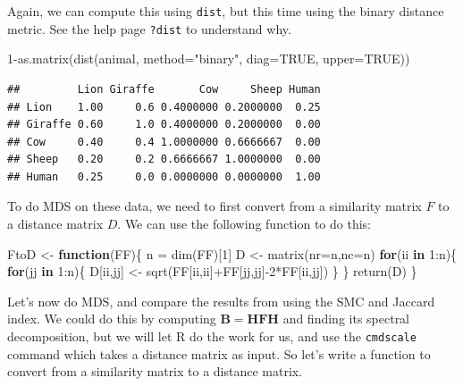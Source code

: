 \documentclass[
]{book}
\newenvironment{Shaded}{\begin{snugshade}}{\end{snugshade}}
\newcommand{\AttributeTok}[1]{\textcolor[rgb]{0.77,0.63,0.00}{#1}}
\newcommand{\ConstantTok}[1]{\textcolor[rgb]{0.00,0.00,0.00}{#1}}
\newcommand{\ControlFlowTok}[1]{\textcolor[rgb]{0.13,0.29,0.53}{\textbf{#1}}}
\newcommand{\DecValTok}[1]{\textcolor[rgb]{0.00,0.00,0.81}{#1}}
\newcommand{\FunctionTok}[1]{\textcolor[rgb]{0.00,0.00,0.00}{#1}}
\newcommand{\NormalTok}[1]{#1}
\newcommand{\OtherTok}[1]{\textcolor[rgb]{0.56,0.35,0.01}{#1}}
\newcommand{\SpecialCharTok}[1]{\textcolor[rgb]{0.00,0.00,0.00}{#1}}
\newcommand{\StringTok}[1]{\textcolor[rgb]{0.31,0.60,0.02}{#1}}
\theoremstyle{definition}
\theoremstyle{definition}
\theoremstyle{definition}
\theoremstyle{definition}
\theoremstyle{remark}
\begin{document}
Again, we can compute this using \texttt{dist}, but this time using the binary distance metric. See the help page \texttt{?dist} to understand why.

\begin{Shaded}
\begin{Highlighting}[]
\DecValTok{1}\SpecialCharTok{{-}}\FunctionTok{as.matrix}\NormalTok{(}\FunctionTok{dist}\NormalTok{(animal, }\AttributeTok{method=}\StringTok{"binary"}\NormalTok{, }\AttributeTok{diag=}\ConstantTok{TRUE}\NormalTok{, }\AttributeTok{upper=}\ConstantTok{TRUE}\NormalTok{))}
\end{Highlighting}
\end{Shaded}

\begin{verbatim}
##         Lion Giraffe       Cow     Sheep Human
## Lion    1.00     0.6 0.4000000 0.2000000  0.25
## Giraffe 0.60     1.0 0.4000000 0.2000000  0.00
## Cow     0.40     0.4 1.0000000 0.6666667  0.00
## Sheep   0.20     0.2 0.6666667 1.0000000  0.00
## Human   0.25     0.0 0.0000000 0.0000000  1.00
\end{verbatim}

To do MDS on these data, we need to first convert from a similarity matrix \(F\) to a distance matrix \(D\). We can use the following function to do this:

\begin{Shaded}
\begin{Highlighting}[]
\NormalTok{FtoD }\OtherTok{\textless{}{-}} \ControlFlowTok{function}\NormalTok{(FF)\{}
\NormalTok{  n }\OtherTok{=} \FunctionTok{dim}\NormalTok{(FF)[}\DecValTok{1}\NormalTok{]}
\NormalTok{  D }\OtherTok{\textless{}{-}} \FunctionTok{matrix}\NormalTok{(}\AttributeTok{nr=}\NormalTok{n,}\AttributeTok{nc=}\NormalTok{n)}
  \ControlFlowTok{for}\NormalTok{(ii }\ControlFlowTok{in} \DecValTok{1}\SpecialCharTok{:}\NormalTok{n)\{}
    \ControlFlowTok{for}\NormalTok{(jj }\ControlFlowTok{in} \DecValTok{1}\SpecialCharTok{:}\NormalTok{n)\{}
\NormalTok{      D[ii,jj] }\OtherTok{\textless{}{-}} \FunctionTok{sqrt}\NormalTok{(FF[ii,ii]}\SpecialCharTok{+}\NormalTok{FF[jj,jj]}\SpecialCharTok{{-}}\DecValTok{2}\SpecialCharTok{*}\NormalTok{FF[ii,jj])}
\NormalTok{    \}}
\NormalTok{  \}}
  \FunctionTok{return}\NormalTok{(D)}
\NormalTok{\}}
\end{Highlighting}
\end{Shaded}

Let's now do MDS, and compare the results from using the SMC and Jaccard index. We could do this by computing \(\mathbf B= \mathbf H\mathbf F\mathbf H\) and finding its spectral decomposition, but we will let R do the work for us, and use the \texttt{cmdscale} command which takes a distance matrix as input. So let's write a function to convert from a similarity matrix to a distance matrix.
\end{document}
